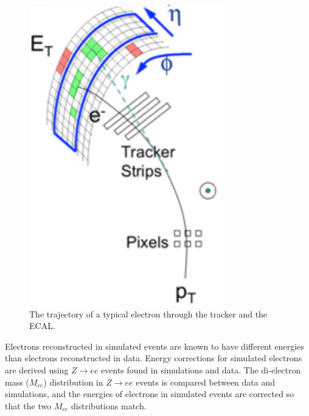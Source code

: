 \begin{figure}[h]
	\centering
	\includegraphics[width=0.75\textwidth]{figures/electronTrackAndSupercluster.png}
	\caption{The trajectory of a typical electron through the tracker and the ECAL.}
	\label{fig:eleTrackAndSC}
\end{figure}

Electrons reconstructed in simulated events are known to have different energies than electrons reconstructed in data.  Energy 
corrections for simulated electrons are derived using $Z \rightarrow ee$ events found in simulations and data.  The di-electron mass 
($M_{ee}$) distribution in $Z \rightarrow ee$ events is compared between data and simulations, and the energies of electrons 
in simulated events are corrected so that the two $M_{ee}$ distributions match.

